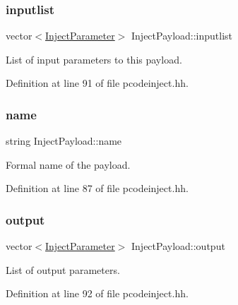 \subsubsection{\texorpdfstring{inputlist}{inputlist}}
{\footnotesize\ttfamily vector$<$\mbox{\hyperlink{class_inject_parameter}{Inject\+Parameter}}$>$ Inject\+Payload\+::inputlist\hspace{0.3cm}{\ttfamily [protected]}}



List of input parameters to this payload. 



Definition at line 91 of file pcodeinject.\+hh.

\mbox{\label{class_inject_payload_a709732dc6d429767b1ef8046cc0f5573}} 
\subsubsection{\texorpdfstring{name}{name}}
{\footnotesize\ttfamily string Inject\+Payload\+::name\hspace{0.3cm}{\ttfamily [protected]}}



Formal name of the payload. 



Definition at line 87 of file pcodeinject.\+hh.

\mbox{\label{class_inject_payload_adc1cb331a8229c5fd1dd8000cc6da97c}} 
\subsubsection{\texorpdfstring{output}{output}}
{\footnotesize\ttfamily vector$<$\mbox{\hyperlink{class_inject_parameter}{Inject\+Parameter}}$>$ Inject\+Payload\+::output\hspace{0.3cm}{\ttfamily [protected]}}



List of output parameters. 



Definition at line 92 of file pcodeinject.\+hh.

\mbox{\label{class_inject_payload_a0112de01e5a392fe5903bf3868d2e34b}} 
